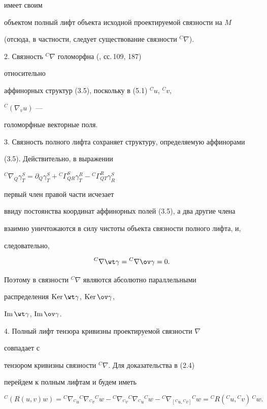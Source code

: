 имеет своим


объектом полный лифт объекта исходной проектируемой связности на $M$


(отсюда, в частности, следует существование связности ${}^C\nabla$).





2. Связность ${}^C\nabla$ голоморфна (\cite{7}, сс.\,109, 187)


относительно


аффинорных структур (3.5), поскольку в (5.1) ${}^C u$, ${}^C v$,


${}^C(\nabla_v u)$ ---


голоморфные векторные поля.





3. Связность полного лифта сохраняет структуру, определяемую аффинорами


(3.5). Действительно, в выражении


${}^C\nabla_Q\gamma^S_T=\partial_Q\gamma^S_T+


{}^C\Gamma^S_{QR}\gamma^R_T-{}^C\Gamma^R_{QT}\gamma^S_R$


первый член правой части исчезает


ввиду постоянства координат аффинорных полей (3.5), а два другие члена


взаимно уничтожаются в силу чистоты объекта связности полного лифта, и,


следовательно,


\begin{equation}


{}^C\nabla{\wt\gamma}={}^C\nabla{\ov\gamma}=0.


\end{equation}


Поэтому в связности ${}^C\nabla$ являются абсолютно параллельными


распределения $\Ker\wt\gamma$, $\Ker\ov\gamma$,


$\im\wt\gamma$, $\im\ov\gamma$.





4. Полный лифт тензора кривизны проектируемой связности $\nabla$


совпадает с


тензором кривизны связности ${}^C\nabla$. Для доказательства в (2.4)


перейдем к полным лифтам и будем иметь


\begin{equation}


{}^C(R(u,v)w)={}^C\nabla_{{}^C u}{}^C\nabla_{{}^C v}


{}^C w-{}^C\nabla_{{}^C v}{}^C\nabla_{{}^C u}{}^C w-


{}^C\nabla_{[{}^C u,{}^C v]}{}^C w=


{}^C R({}^C u,{}^C v)\,{}^C w.


\end{equation}


